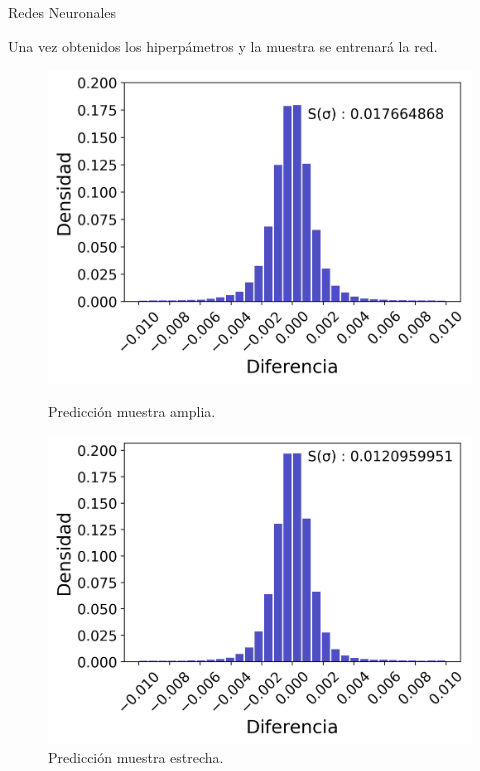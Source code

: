 \documentclass{beamer}
\begin{document}
\begin{frame}{Redes Neuronales}

    Una vez obtenidos los hiperp\'ametros y la muestra se entrenar\'a la red.

    \begin{figure}[!tbp]
      \centering
      \begin{minipage}[b]{0.45\textwidth}
        \includegraphics[width=\textwidth]{Predic_w_n.png}
        \caption{Predicci\'on muestra amplia.}
      \end{minipage}
      \hfill
      \begin{minipage}[b]{0.45\textwidth}
        \includegraphics[width=\textwidth]{Predic_n_n.png}
        \caption{Predicci\'on muestra estrecha.}
      \end{minipage}
    \end{figure}

\end{frame}
\end{document}
